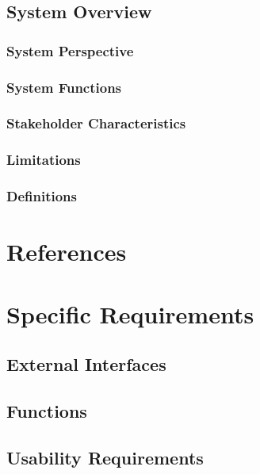 \documentclass[a4paper]{article}
\begin{document}
            \subsection{System Overview}

                \subsubsection{System Perspective}

                \subsubsection{System Functions}

                \subsubsection{Stakeholder Characteristics}

                \subsubsection{Limitations}

            \subsubsection{Definitions}

    \section{References}

    \section{Specific Requirements}

        \subsection{External Interfaces}

        \subsection{Functions}

        \subsection{Usability Requirements}
\end{document}
